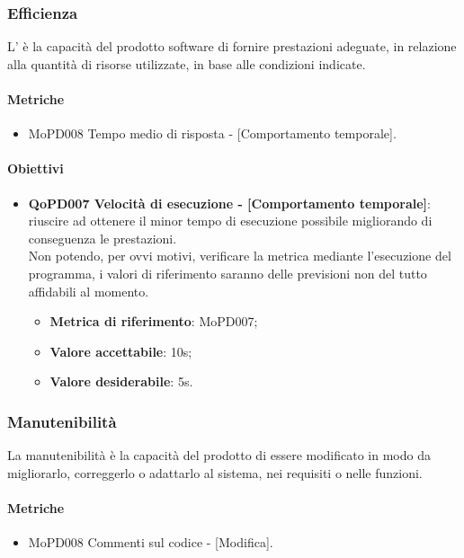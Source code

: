\documentclass[../piano-di-qualifica.tex]{subfiles}
\begin{document}
\subsubsection{Efficienza}%
\label{sub:efficienza}
L' è la capacità del prodotto software di fornire prestazioni adeguate, in relazione alla quantità di
risorse utilizzate, in base alle condizioni indicate.

\paragraph{Metriche}
\label{sub:metriche}
\begin{itemize}
    \item MoPD008 Tempo medio di risposta - [Comportamento temporale].
\end{itemize}

\paragraph{Obiettivi}
\label{sub:obiettivi}
\begin{itemize}
    \item \textbf{QoPD007 Velocità di esecuzione - [Comportamento temporale]}: riuscire ad ottenere il minor tempo di esecuzione possibile migliorando di conseguenza le prestazioni.
    \\ Non potendo, per ovvi motivi, verificare la metrica mediante l'esecuzione del programma, i valori di riferimento saranno delle previsioni non del tutto affidabili al momento.
        \begin{itemize}
            \item \textbf{Metrica di riferimento}: MoPD007;
            \item \textbf{Valore accettabile}: 10s;
            \item \textbf{Valore desiderabile}: 5s.
        \end{itemize}
\end{itemize}

\subsubsection{Manutenibilità}%
\label{sub:manutenibilita}
La manutenibilità è la capacità del prodotto di essere modificato in modo da migliorarlo, correggerlo o adattarlo al sistema, nei requisiti o nelle funzioni.

\paragraph{Metriche}
\label{sub:metriche}
\begin{itemize}
    \item MoPD008 Commenti sul codice - [Modifica].
\end{itemize}
\end{document}
